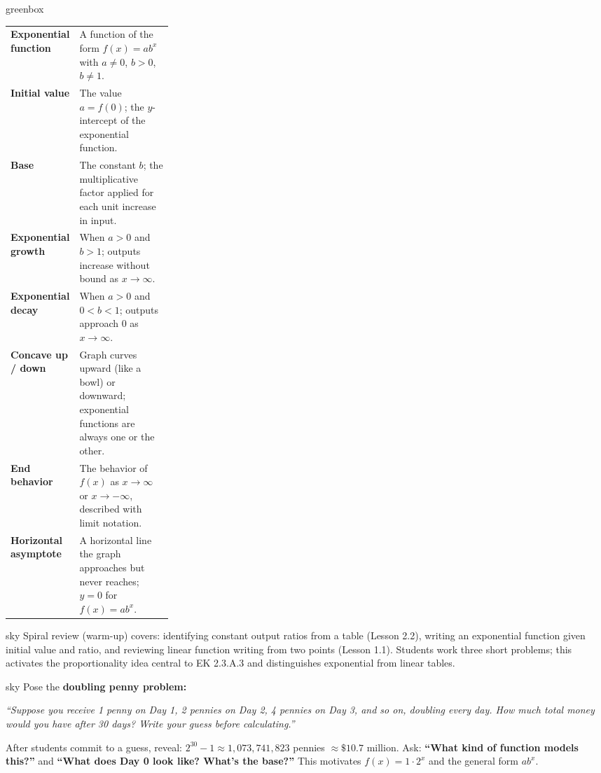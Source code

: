 \documentclass[10pt]{article}
\begin{document}
\begin{skillbox}{greenbox}
\renewcommand{\arraystretch}{1.4}
\begin{tabularx}{\linewidth}{@{} >{\leavevmode\bfseries\color{navy}}p{0.27\linewidth} X @{}}
Exponential function   & A function of the form $f(x) = ab^x$ with $a \ne 0$, $b > 0$, $b \ne 1$. \\
Initial value          & The value $a = f(0)$; the $y$-intercept of the exponential function. \\
Base                   & The constant $b$; the multiplicative factor applied for each unit increase in input. \\
Exponential growth     & When $a > 0$ and $b > 1$; outputs increase without bound as $x \to \infty$. \\
Exponential decay      & When $a > 0$ and $0 < b < 1$; outputs approach $0$ as $x \to \infty$. \\
Concave up / down      & Graph curves upward (like a bowl) or downward; exponential functions are always one or the other. \\
End behavior           & The behavior of $f(x)$ as $x \to \infty$ or $x \to -\infty$, described with limit notation. \\
Horizontal asymptote   & A horizontal line the graph approaches but never reaches; $y = 0$ for $f(x) = ab^x$. \\
\end{tabularx}
\end{skillbox}

\begin{skillbox}{sky}
    Spiral review (warm-up) covers: identifying constant output ratios from a table (Lesson 2.2),
    writing an exponential function given initial value and ratio, and reviewing linear function
    writing from two points (Lesson 1.1). Students work three short problems; this activates
    the proportionality idea central to EK 2.3.A.3 and distinguishes exponential from linear tables.
\end{skillbox}

\begin{skillbox}[Hook]{sky}
Pose the \textbf{doubling penny problem:}

\medskip
\textit{``Suppose you receive 1 penny on Day 1, 2 pennies on Day 2, 4 pennies on Day 3, and so on,
doubling every day. How much total money would you have after 30 days? Write your guess before
calculating.''}

\medskip
After students commit to a guess, reveal: $2^{30} - 1 \approx 1{,}073{,}741{,}823$ pennies
$\approx \$10.7$ million. Ask: \textbf{``What kind of function models this?''} and
\textbf{``What does Day 0 look like? What's the base?''} This motivates $f(x) = 1 \cdot 2^x$
and the general form $ab^x$.
\end{skillbox}
\end{document}
